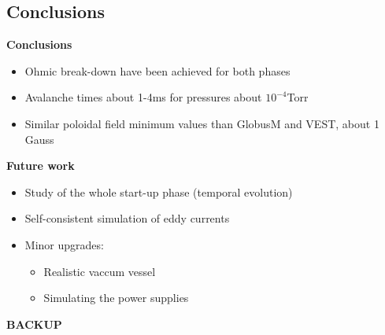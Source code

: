 \documentclass[10pt]{beamer}
\begin{document}
\subsection{Conclusions}
\begin{frame}{\bf Conclusions}

\begin{itemize}

\item Ohmic break-down have been achieved for both phases
\item Avalanche times about 1-4ms for pressures about $10^{-4}$Torr
\item Similar poloidal field minimum values than GlobusM and VEST, about 1 Gauss

\end{itemize}

\begin{block}{\bf Future work}
\begin{itemize}

\item Study of the whole start-up phase (temporal evolution)

\item Self-consistent simulation of eddy currents

\item Minor upgrades:

\begin{itemize}
	\item Realistic vaccum vessel
	\item Simulating the power supplies

\end{itemize}

\end{itemize}
\end{block}

\end{frame}


\begin{frame}
\centering
\begin{huge}
\textbf{BACKUP}
\end{huge}

\end{frame}
\end{document}
